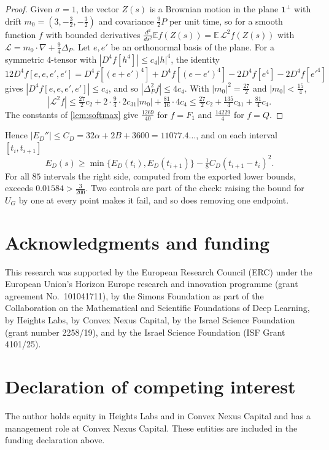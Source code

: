 \documentclass[11pt]{amsart}
\theoremstyle{definition}
\theoremstyle{remark}
\newcommand{\E}{\mathbb{E}}
\newcommand{\one}{\mathbf{1}}
\begin{document}
\begin{proof}
Given $\sigma=1$, the vector $Z(s)$ is a Brownian motion in the plane $\one^\perp$ with drift
$m_0=(3,-\tfrac32,-\tfrac32)$ and covariance $\tfrac92P$ per unit time, so for a smooth function $f$ with
bounded derivatives $\tfrac{d^2}{ds^2}\E f(Z(s))=\E\,\mathcal L^2f(Z(s))$ with
$\mathcal L=m_0\cdot\nabla+\tfrac94\Delta_P$. Let $e,e'$ be an orthonormal basis of the plane. For a symmetric
$4$-tensor with $|D^4f[h^4]|\le c_4|h|^4$, the identity
$12D^4f[e,e,e',e']=D^4f[(e+e')^4]+D^4f[(e-e')^4]-2D^4f[e^4]-2D^4f[e'^4]$ gives $|D^4f[e,e,e',e']|\le c_4$, and so
$|\Delta_P^2f|\le4c_4$. With $|m_0|^2=\tfrac{27}2$ and $|m_0|<\tfrac{15}4$,
\[
|\mathcal L^2f|\le\tfrac{27}2c_2+2\cdot\tfrac94\cdot2c_{31}|m_0|+\tfrac{81}{16}\cdot4c_4
\le\tfrac{27}2c_2+\tfrac{135}4c_{31}+\tfrac{81}4c_4 .
\]
The constants of \cref{lem:softmax} give $\tfrac{1269}{40}$ for $f=F_1$ and $\tfrac{14229}4$ for $f=Q$.
\end{proof}

Hence $|E_D''|\le C_D=32\alpha+2B+3600=11077.4\ldots$, and on each interval $[t_i,t_{i+1}]$
\[
E_D(s)\ge\min\{E_D(t_i),E_D(t_{i+1})\}-\tfrac18C_D(t_{i+1}-t_i)^2 .
\]
For all $85$ intervals the right side, computed from the exported lower bounds, exceeds $0.01584>\tfrac3{200}$.
Two controls are part of the check: raising the bound for $U_G$ by one at every point makes it fail, and so
does removing one endpoint.

\section*{Acknowledgments and funding}
This research was supported by the European Research Council (ERC) under the European Union's Horizon Europe
research and innovation programme (grant agreement No.~101041711), by the Simons Foundation as part of the
Collaboration on the Mathematical and Scientific Foundations of Deep Learning, by Heights Labs, by Convex Nexus
Capital, by the Israel Science Foundation (grant number 2258/19), and by the Israel Science Foundation (ISF Grant
4101/25).

\section*{Declaration of competing interest}
The author holds equity in Heights Labs and in Convex Nexus Capital and has a management role at Convex Nexus
Capital. These entities are included in the funding declaration above.
\end{document}
